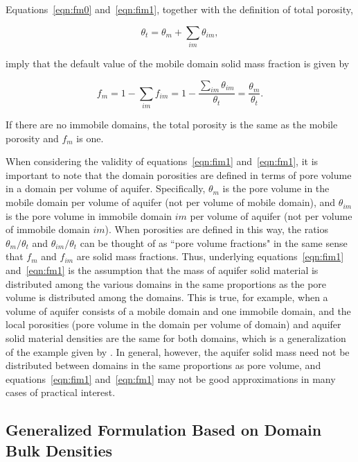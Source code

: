 Equations~\ref{eqn:fm0} and~\ref{eqn:fim1}, together with the definition of total porosity,

\begin{equation}
\label{eqn:thetat1}
\theta_t = \theta_m + \sum_{im}{\theta_{im}},
\end{equation}

\noindent imply that the default value of the mobile domain solid mass fraction is given by

\begin{equation}
\label{eqn:fm1}
f_m = 1 - \sum_{im}f_{im} = 1 - \frac{\sum_{im}\theta_{im}}{\theta_t} = \frac{\theta_m}{\theta_t}.
\end{equation}

\noindent If there are no immobile domains, the total porosity is the same as the mobile porosity and $f_m$ is one.

When considering the validity of equations~\ref{eqn:fim1} and~\ref{eqn:fm1}, it is important to note that the domain porosities are defined in terms of pore volume in a domain per volume of aquifer. Specifically, $\theta_m$ is the pore volume in the mobile domain per volume of aquifer (not per volume of mobile domain), and $\theta_{im}$ is the pore volume in immobile domain $im$ per volume of aquifer (not per volume of immobile domain $im$). When porosities are defined in this way, the ratios $\theta_m / \theta_t$ and $\theta_{im} / \theta_t$ can be thought of as ``pore volume fractions" in the same sense that $f_m$ and $f_{im}$ are solid mass fractions. Thus, underlying equations~\ref{eqn:fim1} and~\ref{eqn:fm1} is the assumption that the mass of aquifer solid material is distributed among the various domains in the same proportions as the pore volume is distributed among the domains. This is true, for example, when a volume of aquifer consists of a mobile domain and one immobile domain, and the local porosities (pore volume in the domain per volume of domain) and aquifer solid material densities are the same for both domains, which is a generalization of the example given by \cite{modflow6gwt}. In general, however, the aquifer solid mass need not be distributed between domains in the same proportions as pore volume, and equations~\ref{eqn:fim1} and~\ref{eqn:fm1} may not be good approximations in many cases of practical interest.

\subsection{Generalized Formulation Based on Domain Bulk Densities} \label{sec:solidmassfrac2b}

